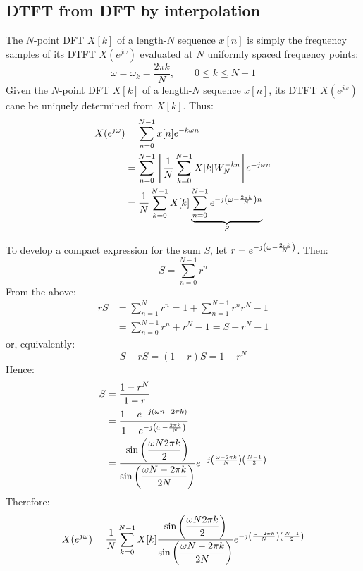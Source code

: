 \documentclass[../../main/main.tex]{subfiles}
\begin{document}
\subsection{DTFT from DFT by interpolation}
The \( N \)-point DFT \( X[k] \) of a length-\( N \) sequence \( x[n] \) is simply the frequency samples of its DTFT \( X(e^{j\omega}) \) evaluated at \( N \) uniformly spaced frequency points:
\begin{equation}
    \omega
    =
    \omega_{k}
    =
    \frac{2\pi k}{N},
    \qquad
    0 \le k \le N-1
    \label{eq:L12_S20_1}
\end{equation}
Given the \( N \)-point DFT \( X[k] \) of a length-\( N \) sequence \( x[n] \), its DTFT \( X(e^{j\omega}) \) cane be uniquely determined from \( X[k] \). Thus:
\begin{align}
    X(e^{j\omega})
    &=
        \sum_{n=0}^{N-1} x[n] e^{-k\omega n}    \nonumber   \\
    &=
        \sum_{n=0}^{N-1} \qty[\frac{1}{N} \sum_{k=0}^{N-1} X[k]W_{N}^{-kn}] e^{-j\omega n}  \nonumber   \\
    &=
        \frac{1}{N} \sum_{k=0}^{N-1} X[k] \underbrace{\sum_{n=0}^{N-1} e^{-j\qty(\omega - \frac{2\pi k}{N})n}}_{S}
\end{align}

To develop a compact expression for the sum \( S \), let \( r = e^{-j\qty(\omega - \frac{2\pi k}{N})} \). Then:
\begin{equation}
    S
    =
    \sum_{n=0}^{N-1} r^{n}
    \label{eq:L12_S22_1}
\end{equation}
From the above:
\begin{align}
    rS
    &=
        \sum_{n=1}^{N} r^{n} = 1 + \sum_{n=1}^{N-1} r^{n} r^{N} - 1 \nonumber   \\
    &=
        \sum_{n=0}^{N-1} r^{n} + r^{N} - 1 = S + r^{N} - 1
\end{align}
or, equivalently:
\begin{equation}
    S - rS
    =
    (1-r)S
    =
    1 - r^{N}
    \label{eq:L12_S23_1}
\end{equation}
Hence:
\begin{align}
    S
    &=
        \frac{1-r^{N}}{1-r} \nonumber   \\
    &=
        \frac{1-e^{-j\qty(\omega n - 2\pi k)}}{1-e^{-j\qty(\omega - \frac{2\pi k}{N})}} \nonumber   \\
    &=
        \frac{\displaystyle\sin\qty(\frac{\omega N  2\pi k}{2})}{\displaystyle\sin\qty(\frac{\omega N - 2\pi k}{2N})} e^{-j \qty(\frac{\omega - 2\pi k}{N}) \qty(\frac{N-1}{2})}
\end{align}
Therefore:
\begin{equation}
    X(e^{j\omega})
    =
    \frac{1}{N} \sum_{k=0}^{N-1} X[k]
    \frac{\displaystyle\sin\qty(\frac{\omega N  2\pi k}{2})}{\displaystyle\sin\qty(\frac{\omega N - 2\pi k}{2N})}
    e^{-j \qty(\frac{\omega - 2\pi k}{N}) \qty(\frac{N-1}{2})}
    \label{eq:L12_S24_1}
\end{equation}
\end{document}
